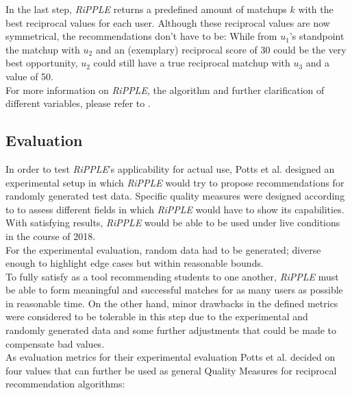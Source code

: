 \documentclass[conference]{IEEEtran}
\begin{document}
In the last step, \textit{RiPPLE} returns a predefined amount of matchups \(k\) with the best reciprocal values for each user. Although these reciprocal values are now symmetrical, the recommendations don't have to be: While from \(u_1\)'s standpoint the matchup with \(u_2\) and an (exemplary) reciprocal score of 30 could be the very best opportunity, \(u_2\) could still have a true reciprocal matchup with \(u_3\) and a value of 50.\\
For more information on \textit{RiPPLE}, the algorithm and further clarification of different variables, please refer to \cite{potts2018reciprocal}.\\	

\subsection{Evaluation}\label{paper:evaluation}
In order to test \textit{RiPPLE}'s applicability for actual use, Potts et al. designed an experimental setup in which \textit{RiPPLE} would try to propose recommendations for randomly generated test data. Specific quality measures were designed according to \cite{olakanmi2017group} to assess different fields in which \textit{RiPPLE} would have to show its capabilities. With satisfying results, \textit{RiPPLE} would be able to be used under live conditions in the course of 2018.\\
For the experimental evaluation, random data had to be generated; diverse enough to highlight edge cases but within reasonable bounds.\\ 
To fully satisfy as a tool recommending students to one another, \textit{RiPPLE} must be able to form meaningful and successful matches for as many users as possible in reasonable time. On the other hand, minor drawbacks in the defined metrics were considered to be tolerable in this step due to the experimental and randomly generated data and some further adjustments that could be made to compensate bad values.\\
As evaluation metrics for their experimental evaluation Potts et al. decided on four values that can further be used as general Quality Measures for reciprocal recommendation algorithms:\\
\end{document}
